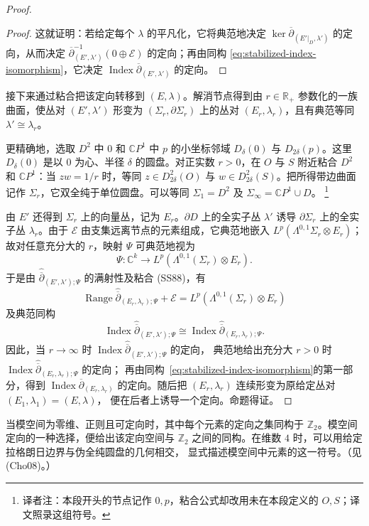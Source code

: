\begin{proof}
\begin{proof}
这就证明：若给定每个 $\lambda$ 的平凡化，它将典范地决定
$\ker\overline\partial_{(E'|_D,\lambda')}$ 的定向，从而决定
$\overline\partial_{(E',\lambda')}^{-1}(0\oplus\mathcal E)$ 的定向；再由同构
\eqref{eq:stabilized-index-isomorphism}，它决定
$\operatorname{Index}\overline\partial_{(E',\lambda')}$ 的定向。
\end{proof}

接下来通过粘合把该定向转移到 $(E,\lambda)$。解消节点得到由 $r\in\mathbb R_+$
参数化的一族\personRiemann{}曲面，使丛对 $(E',\lambda')$ 形变为
$(\Sigma_r,\partial\Sigma_r)$ 上的丛对 $(E_r,\lambda_r)$，且有典范等同
$\lambda'\cong\lambda_r$。

更精确地，选取 $D^2$ 中 $0$ 和 $\mathbb CP^1$ 中 $p$ 的小坐标邻域
$D_\delta(0)$ 与 $D_{2\delta}(p)$。这里 $D_\delta(0)$ 是以 $0$ 为心、半径
$\delta$ 的圆盘。对正实数 $r>0$，在 $O$ 与 $S$ 附近粘合 $D^2$ 和
$\mathbb CP^1$：当 $zw=1/r$ 时，等同
$z\in D_{2\delta}^2(O)$ 与 $w\in D_{2\delta}^2(S)$。把所得带边\personRiemann{}曲面记作
$\Sigma_r$，它双全纯于单位圆盘。可以等同 $\Sigma_1=D^2$ 及
$\Sigma_\infty=\mathbb CP^1\cup D$。
\footnote{译者注：本段开头的节点记作 $0,p$，粘合公式却改用未在本段定义的
$O,S$；译文照录这组符号。}

由 $E'$ 还得到 $\Sigma_r$ 上的向量丛，记为 $E_r$。$\partial D$ 上的全实子丛
$\lambda'$ 诱导 $\partial\Sigma_r$ 上的全实子丛 $\lambda_r$。由于 $\mathcal E$
由支集远离节点的元素组成，它典范地嵌入
$L^p(\Lambda^{0,1}\Sigma_r\otimes E_r)$；故对任意充分大的 $r$，映射 $\Psi$
可典范地视为
\[
 \Psi:\mathbb C^k\longrightarrow L^p(\Lambda^{0,1}(\Sigma_r)\otimes E_r).
\]
于是由 $\widehat{\overline\partial}_{(E',\lambda');\Psi}$ 的满射性及粘合
(SS88)，有
\[
 \operatorname{Range}\widehat{\overline\partial}_{(E_r,\lambda_r);\Psi}
 +\mathcal E=L^p(\Lambda^{0,1}(\Sigma_r)\otimes E_r)
\]
及典范同构
\[
 \operatorname{Index}\widehat{\overline\partial}_{(E',\lambda');\Psi}
 \cong\operatorname{Index}\widehat{\overline\partial}_{(E_r,\lambda_r);\Psi}.
\]
因此，当 $r\to\infty$ 时
$\operatorname{Index}\widehat{\overline\partial}_{(E',\lambda');\Psi}$ 的定向，
典范地给出充分大 $r>0$ 时
$\operatorname{Index}\widehat{\overline\partial}_{(E_r,\lambda_r);\Psi}$ 的定向；
再由同构~\eqref{eq:stabilized-index-isomorphism}的第一部分，得到
$\operatorname{Index}\overline\partial_{(E_r,\lambda_r)}$ 的定向。随后把
$(E_r,\lambda_r)$ 连续形变为原给定丛对 $(E_1,\lambda_1)=(E,\lambda)$，
便在后者上诱导一个定向。命题得证。
\end{proof}

当模空间为零维、正则且可定向时，其中每个元素的定向之集同构于
$\mathbb Z_2$。模空间定向的一种选择，便给出该定向空间与 $\mathbb Z_2$
之间的同构。在维数 $4$ 时，可以用给定拉格朗日边界与伪全纯圆盘的几何相交，
显式描述模空间中元素的这一符号。（见 (Cho08)。）

